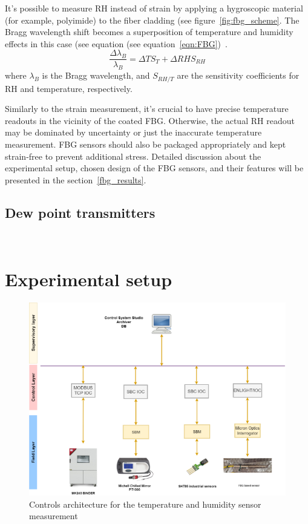 It's possible to measure RH instead of strain by applying a hygroscopic material (for example, polyimide) to the fiber cladding (see figure~\ref{fig:fbg_scheme}. The  Bragg wavelength shift becomes a superposition of temperature and humidity effects in this case (see equation (see equation~\ref{eqn:FBG})~\cite{Kronenberg:02, YEO2008280}. 
                             \begin{equation}\label{eqn:FBG}
                                    \frac{\Delta\lambda_{B}}{\lambda_{B}}=\Delta TS_{T}+\Delta RHS_{RH}
                            \end{equation}
                            where $\lambda_{B}$ is the Bragg wavelength, and $S_{RH/T}$ are the sensitivity coefficients for RH and temperature, respectively. 

Similarly to the strain measurement, it’s crucial to have precise temperature readouts in the vicinity of the coated FBG. Otherwise, the actual RH readout may be dominated by uncertainty or just the inaccurate temperature measurement. FBG sensors should also be packaged appropriately and kept strain-free to prevent additional stress. Detailed discussion about the experimental setup, chosen design of the \gls{FBG} sensors, and their features will be presented in the section~\ref{fbg_results}.



\subsection{Dew point transmitters}


~\cite{michell_e20}

 
\section{Experimental setup}


\begin{figure}[!h]
\centering
\includegraphics[width=0.75\columnwidth]{Chapter5/images/FOS_dcs_scheme.png}
\caption{Controls architecture for the temperature and humidity sensor measurement}
\label{fig:fos_arch}
\end{figure}

